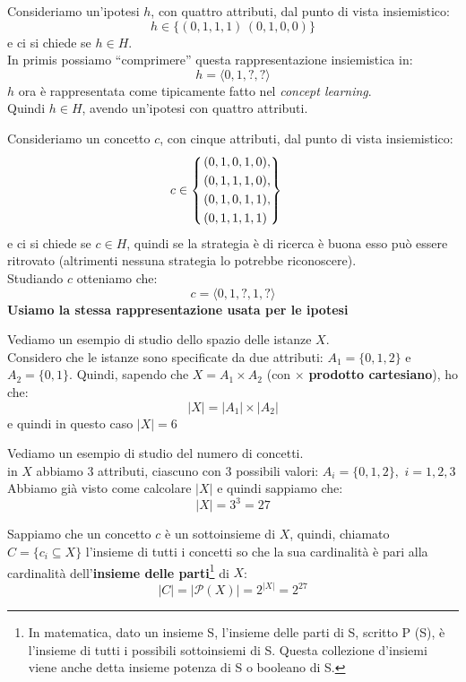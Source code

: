 \begin{esempio}
  Consideriamo un'ipotesi $h$, con quattro attributi, dal punto di vista
  insiemistico: 
  \[h\in\{( 0, 1, 1, 1)\,(0, 1, 0, 0)\}\]
  e ci si chiede se $h\in H$.\\
  In primis possiamo ``comprimere'' questa rappresentazione insiemistica in:
  \[h=\langle 0, 1, ?, ?\rangle\]
  $h$ ora è rappresentata come tipicamente fatto nel \textit{concept
    learning}.\\
  Quindi $h\in H$, avendo un'ipotesi con quattro attributi. 
\end{esempio}
\begin{esempio}
  Consideriamo un concetto $c$, con cinque attributi, dal punto di vista
  insiemistico:
  \[c\in
    \begin{cases}
      \begin{rcases}
        (0,1,0,1,0),\\
        (0,1,1,1,0),\\
        (0,1,0,1,1),\\
        (0,1,1,1,1)
      \end{rcases}
    \end{cases}
  \]
  e ci si chiede se $c\in H$, quindi se la strategia è di ricerca è buona esso
  può essere ritrovato (altrimenti nessuna strategia lo potrebbe riconoscere).\\
  Studiando $c$ otteniamo che:
  \[c=\langle 0,1,?,1,?\rangle\]
  \textbf{Usiamo la stessa rappresentazione usata per le ipotesi}
\end{esempio}
\begin{esempio}
  Vediamo un esempio di studio dello spazio delle istanze $X$.\\
  Considero che le istanze sono specificate da due attributi: $A_1=\{0,1,2\}$ e
  $A_2=\{0,1\}$.
  Quindi, sapendo che $X=A_1\times A_2$ (con $\times$ \textbf{prodotto
    cartesiano}), ho che: 
  \[|X|=|A_1|\times |A_2|\]
  e quindi in questo caso $|X|=6$
\end{esempio}
\begin{esempio}
  Vediamo un esempio di studio del numero di concetti.\\
  in $X$ abbiamo 3 attributi, ciascuno con 3 possibili valori:
  $A_i=\{0,1,2\},\,\,i= 1,2,3$
  Abbiamo già visto come calcolare $|X|$ e quindi sappiamo che:
  \[|X|=3^3=27\]
  
  Sappiamo che un concetto $c$ è un sottoinsieme di $X$, quindi, chiamato
  $C=\{c_i\subseteq X\}$ l'insieme di tutti i concetti so che la sua cardinalità
  è pari alla cardinalità dell'\textbf{insieme delle parti}\footnote{In matematica, dato un insieme S, l'insieme delle parti di S, scritto P (S), è l'insieme di tutti i possibili sottoinsiemi di S. Questa collezione d'insiemi viene anche detta insieme potenza di S o booleano di S.} di $X$:
  \[|C|=|\mathcal{P}(X)|=2^{|X|}=2^{27}\]
\end{esempio}
